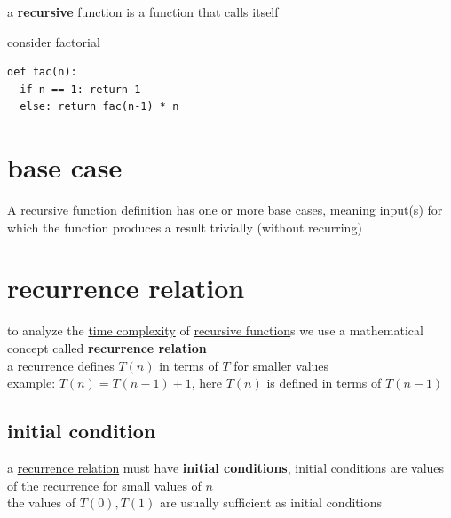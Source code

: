 \documentclass[a4paper,12pt]{article}
\begin{document}
\newenvironment{note}
  {\begin{bclogo}[logo=\bcinfo, couleurBarre=orange, couleur=lightgray]{ note}}
  {\end{bclogo}}
\newenvironment{attention}
  {\begin{bclogo}[logo=\bcattention, couleurBarre=red, noborder=true, 
                couleur=red!15]{Important!}}
  {\end{bclogo}}

\begin{definition}
a \textbf{recursive} function is a function that calls itself\\

\begin{my_example}
consider factorial\\
\lstset{language=Python,label= ,caption= ,captionpos=b,numbers=none}
\begin{lstlisting}
def fac(n):
  if n == 1: return 1
  else: return fac(n-1) * n
\end{lstlisting}
\end{my_example}
\end{definition}
\section{base case}
\label{sec:orged2117d}
\begin{definition}
A recursive function definition has one or more base cases, meaning input(s) for which the function produces a result trivially (without recurring)\\
\end{definition}
\section{recurrence relation}
\label{sec:org4c65e1c}
to analyze the \href{20221130014441-time_complexity.org}{time complexity} of \href{20221105001640-recursive_function.org}{recursive function}s we use a mathematical concept called \textbf{recurrence relation}\\
a recurrence defines \(T(n)\) in terms of \(T\) for smaller values\\
example: \(T(n) = T(n-1) + 1\), here \(T(n)\) is defined in terms of \(T(n-1)\)\\
\subsection{initial condition}
\label{sec:org00b3e36}
a \hyperref[sec:org4c65e1c]{recurrence relation} must have \textbf{initial conditions}, initial conditions are values of the recurrence for small values of \(n\)\\
the values of \(T(0),T(1)\) are usually sufficient as initial conditions\\
\end{document}
